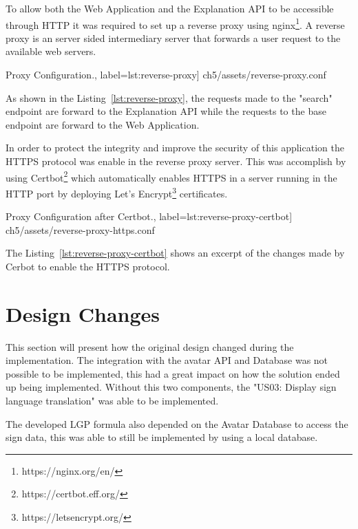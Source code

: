 To allow both the Web Application and the Explanation API to be accessible through HTTP it was required to set up a reverse proxy using nginx\footnote{https://nginx.org/en/}.
A reverse proxy is an server sided intermediary server that forwards a user request to the available web servers.

\begin{center}
\begin{minipage}{0.95\linewidth}
 Proxy Configuration.,
label=lst:reverse-proxy]
{ch5/assets/reverse-proxy.conf}
\end{minipage}
\end{center}

As shown in the Listing~\ref{lst:reverse-proxy}, the requests made to the "search" endpoint are forward to the Explanation API while the requests to the base endpoint are forward to the Web Application.

In order to protect the integrity and improve the security of this application the HTTPS protocol was enable in the reverse proxy server.
This was accomplish by using Certbot\footnote{https://certbot.eff.org/} which automatically enables HTTPS in a server running in the HTTP port by deploying Let's Encrypt\footnote{https://letsencrypt.org/} certificates.

\begin{center}
\begin{minipage}{0.95\linewidth}
 Proxy Configuration after Certbot.,
label=lst:reverse-proxy-certbot]
{ch5/assets/reverse-proxy-https.conf}
\end{minipage}
\end{center}

The Listing~\ref{lst:reverse-proxy-certbot} shows an excerpt of the changes made by Cerbot to enable the HTTPS protocol.

\section{Design Changes}

This section will present how the original design changed during the implementation.
The integration with the avatar API and Database was not possible to be implemented, this had a great impact on how the solution ended up being implemented.
Without this two components, the "US03: Display sign language translation" was able to be implemented.

The developed \gls{LGP} formula also depended on the Avatar Database to access the sign data, this was able to still be implemented by using a local database.

